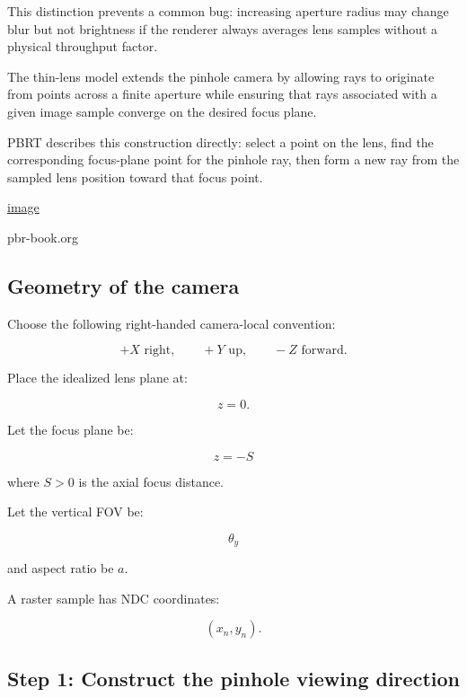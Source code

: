 This distinction prevents a common bug: increasing aperture radius may change blur but not brightness if the renderer always averages lens samples without a physical throughput factor.

The thin-lens model extends the pinhole camera by allowing rays to originate from points across a finite aperture while ensuring that rays associated with a given image sample converge on the desired focus plane.

PBRT describes this construction directly: select a point on the lens, find the corresponding focus-plane point for the pinhole ray, then form a new ray from the sampled lens position toward that focus point. 

\href{https://www.google.com/s2/favicons?domain=https://www.pbr-book.org&sz=32}{image}

pbr-book.org

\subsection{Geometry of the camera}\label{02-foundations-ii-ch036-geometry-of-the-camera}

\hypertarget{02-foundations-ii-ch036-geometry-of-the-camera}{}

Choose the following right-handed camera-local convention:

\[ +X\text{ right},\qquad+Y\text{ up},\qquad-Z\text{ forward}. \]

Place the idealized lens plane at:

\[ z=0. \]

Let the focus plane be:

\[ \boxed{z=-S} \]

where \(S>0\) is the axial focus distance.

Let the vertical FOV be:

\[ \theta_y \]

and aspect ratio be \(a\).

A raster sample has NDC coordinates:

\[ (x_n,y_n). \]

\subsection{Step 1: Construct the pinhole viewing direction}\label{02-foundations-ii-ch036-step-1-construct-the-pinhole-viewing-direction}

\hypertarget{02-foundations-ii-ch036-step-1-construct-the-pinhole-viewing-direction}{}

